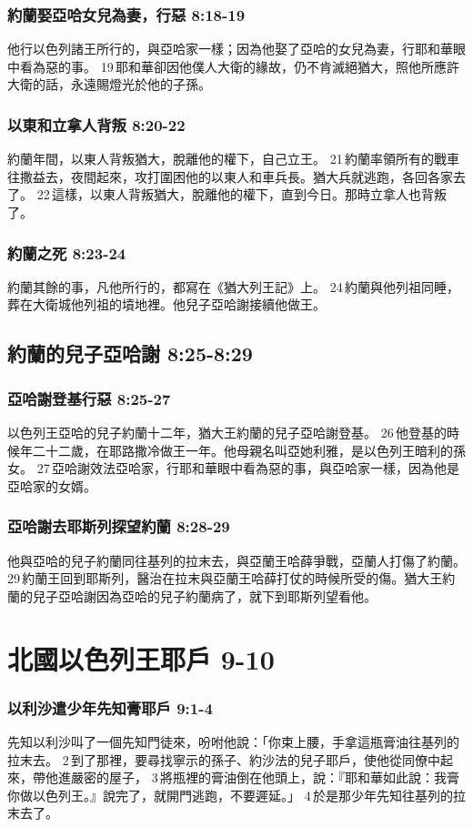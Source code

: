 \subsubsection{約蘭娶亞哈女兒為妻，行惡 8:18-19}
他行以色列諸王所行的，與亞哈家一樣；因為他娶了亞哈的女兒為妻，行耶和華眼中看為惡的事。 19 耶和華卻因他僕人大衛的緣故，仍不肯滅絕猶大，照他所應許大衛的話，永遠賜燈光於他的子孫。

\subsubsection{以東和立拿人背叛 8:20-22}
約蘭年間，以東人背叛猶大，脫離他的權下，自己立王。 21 約蘭率領所有的戰車往撒益去，夜間起來，攻打圍困他的以東人和車兵長。猶大兵就逃跑，各回各家去了。 22 這樣，以東人背叛猶大，脫離他的權下，直到今日。那時立拿人也背叛了。

\subsubsection{約蘭之死 8:23-24}
約蘭其餘的事，凡他所行的，都寫在《猶大列王記》上。 24 約蘭與他列祖同睡，葬在大衛城他列祖的墳地裡。他兒子亞哈謝接續他做王。

\subsection{約蘭的兒子亞哈謝 8:25-8:29 }
\subsubsection{亞哈謝登基行惡 8:25-27}
以色列王亞哈的兒子約蘭十二年，猶大王約蘭的兒子亞哈謝登基。 26 他登基的時候年二十二歲，在耶路撒冷做王一年。他母親名叫亞她利雅，是以色列王暗利的孫女。 27 亞哈謝效法亞哈家，行耶和華眼中看為惡的事，與亞哈家一樣，因為他是亞哈家的女婿。

\subsubsection{亞哈謝去耶斯列探望約蘭 8:28-29}
他與亞哈的兒子約蘭同往基列的拉末去，與亞蘭王哈薛爭戰，亞蘭人打傷了約蘭。 29 約蘭王回到耶斯列，醫治在拉末與亞蘭王哈薛打仗的時候所受的傷。猶大王約蘭的兒子亞哈謝因為亞哈的兒子約蘭病了，就下到耶斯列望看他。

\section{北國以色列王耶戶 9-10 }
\subsubsection{以利沙遣少年先知膏耶戶 9:1-4}
先知以利沙叫了一個先知門徒來，吩咐他說：「你束上腰，手拿這瓶膏油往基列的拉末去。 2 到了那裡，要尋找寧示的孫子、約沙法的兒子耶戶，使他從同僚中起來，帶他進嚴密的屋子， 3 將瓶裡的膏油倒在他頭上，說：『耶和華如此說：我膏你做以色列王。』說完了，就開門逃跑，不要遲延。」 4 於是那少年先知往基列的拉末去了。

